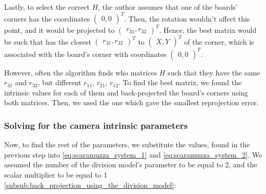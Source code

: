 Lastly, to select the correct \(H\), the author assumes that one of the boards'
corners has the coordinates \( \begin{pmatrix}
	0, 0
\end{pmatrix}^{T}\). Then, the rotation wouldn't affect this
point, and it would be projected to   \(\begin{pmatrix}
	r_{31}, r_{32}
\end{pmatrix}^{T}\). Hence, the best matrix would be such that has the closest
\(\begin{pmatrix}
	r_{31}, r_{32}
\end{pmatrix}^{T}\) to \(\begin{pmatrix}
	X, Y
\end{pmatrix}^{T}\) of the corner, which is associated with the board's corner
with coordinates \(\begin{pmatrix}
	0, 0
\end{pmatrix}^{T}\).

However, often the algorithm finds who matrices \(H\) such that they have the
same \(r_{31}\) and \(r_{32} \), but different \(r_{11}\), \(r_{21}\), \(r_{12}\). To
find the best matrix, we found the intrinsic values for each of them and
back-projected the board's corners using both matrices.
Then, we used the one which gave the smallest reprojection error.

\subsubsection{Solving for the camera intrinsic parameters}\label{subsub:solving_for_the_camera_intrinsic_parameters}

Now, to find the rest of the parameters, we substitute the values, found in the
previous step into \cref{eq:scaramuzza_system_1} and
\cref{eq:scaramuzza_system_2}. We assumed the number of the division model's
parameter to be equal to 2, and the scalar multiplier to be equal to 1
\cref{subsub:back_projection_using_the_division_model}:


